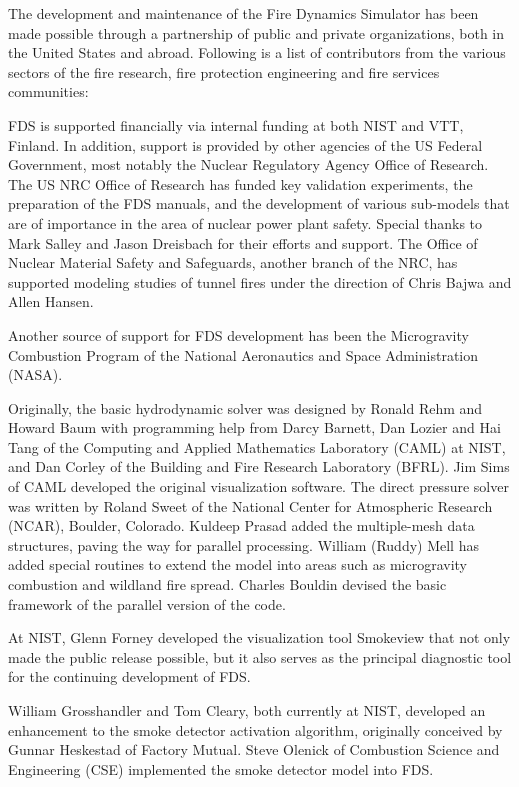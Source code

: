 \documentclass[11pt]{book}
\begin{document}
\label{acksection}

The development and maintenance of the Fire Dynamics Simulator has been made possible through
a partnership of public and private organizations, both in the United States and abroad. Following
is a list of contributors from the various sectors of the fire research, fire protection engineering and
fire services communities:

FDS is supported financially via internal funding at both NIST and
VTT, Finland. In addition, support is provided by other agencies of
the US Federal Government, most notably the Nuclear Regulatory Agency
Office of Research. The US NRC Office of Research has funded key
validation experiments, the preparation of the FDS manuals, and the
development of various sub-models that are of importance in the area
of nuclear power plant safety. Special thanks to Mark Salley and Jason
Dreisbach for their efforts and support.  The Office of Nuclear
Material Safety and Safeguards, another branch of the NRC, has
supported modeling studies of tunnel fires under the direction of
Chris Bajwa and Allen Hansen.

Another source of support for FDS development has been the Microgravity Combustion Program of the National Aeronautics and Space
Administration (NASA).

Originally, the basic hydrodynamic solver was designed by Ronald Rehm
and Howard Baum with programming help from Darcy Barnett, Dan Lozier
and Hai Tang of the Computing and Applied Mathematics Laboratory
(CAML) at NIST, and Dan Corley of the Building and Fire Research
Laboratory (BFRL). Jim Sims of CAML developed the original
visualization software.  The direct pressure solver was written by
Roland Sweet of the National Center for Atmospheric Research (NCAR),
Boulder, Colorado.  Kuldeep Prasad added the multiple-mesh data
structures, paving the way for parallel processing.  William (Ruddy)
Mell has added special routines to extend the model into areas such as
microgravity combustion and wildland fire spread. Charles Bouldin
devised the basic framework of the parallel version of the code.

At NIST, Glenn Forney developed the visualization tool Smokeview that
not only made the public release possible, but it also serves as the
principal diagnostic tool for the continuing development of
FDS.

William Grosshandler and Tom Cleary, both currently at NIST, developed
an enhancement to the smoke detector activation algorithm, originally
conceived by Gunnar Heskestad of Factory Mutual. Steve
Olenick of Combustion Science and Engineering (CSE) implemented the
smoke detector model into FDS.
\end{document}
